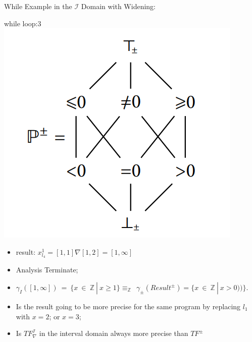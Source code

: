 \begin{frame}{While Example in the  $\mathcal{I}$ Domain with Widening:}
\begin{exampleblock}{while loop:3}
	\centering 
	\centering \includegraphics[scale=0.60]{content/images/static-analysis/sign1.png}
	\begin{itemize}
		\item result: 
		$ x_{l_4}^1 = [1,1] \nabla[1,2]= [1,\infty] $ 		
		\item Analysis Terminate;
				\item $\gamma_{I}([1, \infty])~=~\{x ~\in ~\mathbb{Z}~|~x \geq 1\} \equiv_\mathbb{Z}~~  \gamma_\pm (Result ^\pm)=  \{x ~\in~\mathbb{Z}~|~x > 0) )\}$.
				\item Is the result going to be more precise for the same program by replacing $l_1$ with $x = 2$; or $x = 3$;
				\item Is $TF^{\scriptscriptstyle \mathcal{I}}_{\scriptscriptstyle \nabla}$  in the interval domain always more precise than $TF^{\scriptscriptstyle \pm}$ 
	\end{itemize}
\end{exampleblock}
\end{frame}


